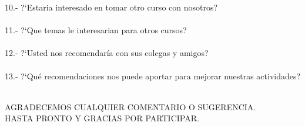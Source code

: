 \documentclass[ngerman,a4paper]{scrartcl}
\begin{document}
\begin{Form}
10.- ?`Estaria interesado en tomar otro curso con nosotros?\\
\TextField[name=p10]{}\\

11.- ?`Que temas le interesarian para otros cursos?\\
\TextField[name=p11]{}\\

12.- ?`Usted nos recomendar\'ia con sus colegas y amigos?\\
\TextField[name=p12]{}\\

13.- ?`Qu\'e recomendaciones nos puede aportar para mejorar nuestras actividades?\\
\TextField[name=p13]{}\\

\begin{center}
	AGRADECEMOS CUALQUIER COMENTARIO O SUGERENCIA.\\
	HASTA PRONTO Y GRACIAS POR PARTICIPAR.
\end{center}

\end{Form}
\end{document}
